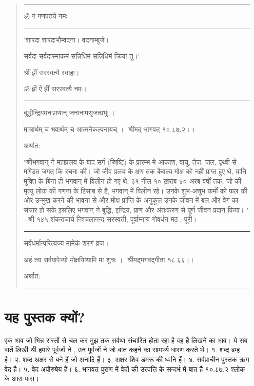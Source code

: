 \documentclass[oneside,11pt]{memoir} %
\begin{document}
\begin{quote}

\noindent\rule{7.5cm}{0.4pt}

ॐ गं गणपतये नमः 

\noindent\rule{7.5cm}{0.4pt}

'शारदा शारदाभौम्वदना। वदनाम्बुजे।

सर्वदा सर्वदास्माकमं सन्निधिमं सन्निधिमं क्रिया तू।'

श्रीं ह्रीं सरस्वत्यै स्वाहा।

ॐ ह्रीं ऐं ह्रीं सरस्वत्यै नमः।

\noindent\rule{7.5cm}{0.4pt}


बुद्धीन्द्रियमनःप्राणान्  जनानामसृजत्प्रभुः ।

मात्रार्थम् च भवार्थम् च आत्मनेकल्पनायच् ।।श्रीमद् भागवत् १०.८७.२।। 

अर्थात:

"श्रीभगवान् ने महाप्रलय के बाद सर्ग (स्रिष्टि) के प्रारम्भ मे आकाश, वायु, तेज, जल, पृथ्वी से मण्डित जगत् कि रचना की। जो जीव प्रलय के क्षण तक कैवल्य मोक्ष को नहीं प्राप्त हुए थे, यानि मुक्ति के बिना ही भगवान् में विलीन हो गए थे, ३१ नील १० ख़राब ४० अरब वर्षों तक, जो की मृत्यु लोक की गणना के हिसाब से है, भगवान् में विलीन रहे। उनके शुभ-अशुभ कर्मों को फल की ओर उन्मुख करने की भावना से और मोक्ष प्राप्ति के अनुकूल उनके जीवन में बल और वेग का संचार हो सके इसलिए भगवान् ने बुद्धि, इन्द्रिय, प्राण और अंतःकरण से पूर्ण जीवन प्रदान किया। " - श्री १४५ शंकराचार्य निश्चलानन्द सरस्वती, पूर्वाम्नाय गोवर्धन मठ , पूरी। 

\noindent\rule{7.5cm}{0.4pt}

सर्वधर्मान्परित्यज्य मामेकं शरणं व्रज।

अहं त्वा सर्वपापेभ्यो मोक्षयिष्यामि मा शुचः ।।श्रीमद्भगवद्गीता १८.६६।। 

अर्थात:


\noindent\rule{7.5cm}{0.4pt}

\end{quote}

\section{यह पुस्तक क्यों?}

एक भाव जो भिन्न रास्तों से चल कर मुझ तक सर्वथा संचारित होता रहा है वह है लिखने का भाव। ये सब बातें लिखी थी हमारे पूर्वजों ने , उन पूर्वजों ने जो बात कहने का सामर्थ्य धारण करते थे। 
१. शब्द ब्रम्ह है। 
२. शब्द अक्षर से बने हैं जो अनादि हैं। 
३. अक्षर शिव डमरू की ध्वनि हैं। 
४. सर्वप्राचीन पुस्तक ऋग वेद है। 
५. वेद अपौरुषेय हैं। 
६. भागवत पुराण में वेदों की उत्त्पत्ति के सन्दर्भ में बात है १०.८७.२ श्लोक के आस पास। 
\end{document}
